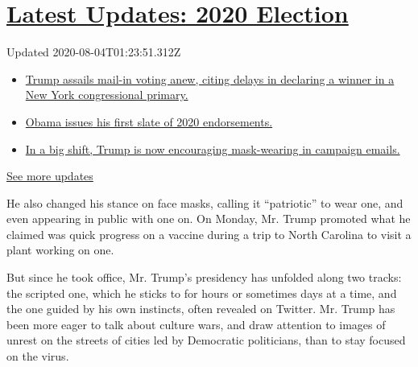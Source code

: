 \hypertarget{latest-updates-2020-election}{%
\section{\texorpdfstring{\href{https://www.nytimes3xbfgragh.onion/2020/08/03/us/elections/biden-vs-trump.html?action=click\&pgtype=Article\&state=default\&region=MAIN_CONTENT_1\&context=storylines_live_updates}{Latest
Updates: 2020
Election}}{Latest Updates: 2020 Election}}\label{latest-updates-2020-election}}

Updated 2020-08-04T01:23:51.312Z

\begin{itemize}
\tightlist
\item
  \href{https://www.nytimes3xbfgragh.onion/2020/08/03/us/elections/biden-vs-trump.html?action=click\&pgtype=Article\&state=default\&region=MAIN_CONTENT_1\&context=storylines_live_updates\#link-6494b448}{Trump
  assails mail-in voting anew, citing delays in declaring a winner in a
  New York congressional primary.}
\item
  \href{https://www.nytimes3xbfgragh.onion/2020/08/03/us/elections/biden-vs-trump.html?action=click\&pgtype=Article\&state=default\&region=MAIN_CONTENT_1\&context=storylines_live_updates\#link-3de249e6}{Obama
  issues his first slate of 2020 endorsements.}
\item
  \href{https://www.nytimes3xbfgragh.onion/2020/08/03/us/elections/biden-vs-trump.html?action=click\&pgtype=Article\&state=default\&region=MAIN_CONTENT_1\&context=storylines_live_updates\#link-54e34d20}{In
  a big shift, Trump is now encouraging mask-wearing in campaign
  emails.}
\end{itemize}

\href{https://www.nytimes3xbfgragh.onion/2020/08/03/us/elections/biden-vs-trump.html?action=click\&pgtype=Article\&state=default\&region=MAIN_CONTENT_1\&context=storylines_live_updates}{See
more updates}

He also changed his stance on face masks, calling it ``patriotic'' to
wear one, and even appearing in public with one on. On Monday, Mr. Trump
promoted what he claimed was quick progress on a vaccine during a trip
to North Carolina to visit a plant working on one.

But since he took office, Mr. Trump's presidency has unfolded along two
tracks: the scripted one, which he sticks to for hours or sometimes days
at a time, and the one guided by his own instincts, often revealed on
Twitter. Mr. Trump has been more eager to talk about culture wars, and
draw attention to images of unrest on the streets of cities led by
Democratic politicians, than to stay focused on the virus.

